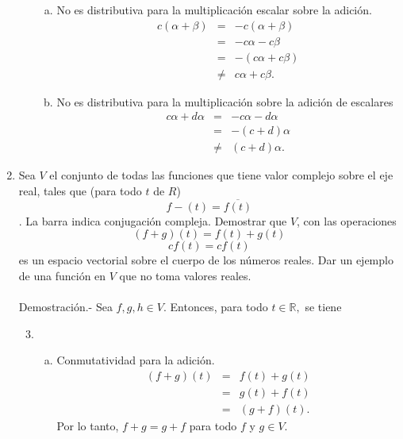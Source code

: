 \begin{enumerate}[\bfseries 1.]
\begin{enumerate}[(1)]
\begin{enumerate}[(a)]
		    \item No es distributiva para la multiplicación escalar sobre la adición.
			$$
			\begin{array}{rcl}
			c(\alpha+\beta) & = & -c(\alpha+\beta)\\
					&=& -c\alpha-c\beta\\
					&=& -(c\alpha+c\beta)\\
					&\neq& c\alpha+c\beta.
			\end{array}
			$$

		    \item No es distributiva para la multiplicación sobre la adición de escalares
			$$
			\begin{array}{rcl}
			    c\alpha + d\alpha & = & -c\alpha - d\alpha\\
					      & = & -(c+d)\alpha\\
					      & \neq & (c+d)\alpha.
			\end{array}
			$$

		\end{enumerate}
		\vspace{.5cm}

	\end{enumerate}

    \item Sea $V$ el conjunto de todas las funciones que tiene valor complejo sobre el eje real, tales que (para todo $t$ de $R$)
    $$f-(t)=\overline{f(t)}$$.
    La barra indica conjugación compleja. Demostrar que $V$, con las operaciones 
    $$(f+g)(t)=f(t)+g(t)$$
    $$cf(t)=cf(t)$$
    es un espacio vectorial sobre el cuerpo de los números reales. Dar un ejemplo de una función en $V$ que no toma valores reales.\\\\
    Demostración.-\; Sea $f,g,h\in V$. Entonces, para todo $t\in \mathbb{R},$ se tiene

	\begin{enumerate}[(1)]
	    \setcounter{enumii}{2}
	    \item 
		\begin{enumerate}[(a)]
		    \item Conmutatividad para la adición. 
			$$
			\begin{array}{rcl}
			    (f+g)(t) & = & f(t)+g(t)\\
				     & = & g(t) + f(t)\\
				     & = & (g+f)(t).
			\end{array}
			$$
			Por lo tanto, $f+g=g+f$ para todo $f$ y $g\in V$.\\


\end{enumerate}
\end{enumerate}
\end{enumerate}
